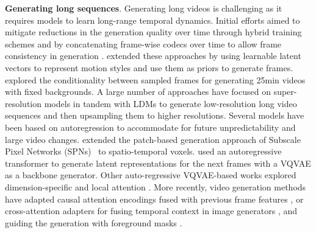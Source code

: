 


\noindent
\textbf{Generating long sequences}. Generating long videos is challenging as it requires models to learn long-range temporal dynamics. Initial efforts aimed to mitigate reductions in the generation quality over time through hybrid training schemes \citep{brooks2022generating} and by concatenating frame-wise codecs over time to allow frame consistency in generation \citep{skorokhodov2022stylegan}. \citet{shen2023mostgan} extended these approaches by using learnable latent vectors to represent motion styles and use them as priors to generate frames. \citet{harvey2022flexible} explored the conditionality between sampled frames for generating 25min videos with fixed backgrounds. A large number of approaches \citep{ho2022imagen,singer2023make} have focused on super-resolution models in tandem with LDMs to generate low-resolution long video sequences and then upsampling them to higher resolutions. Several models have been based on autoregression to accommodate for future unpredictability and large video changes. \citet{weissenborn2020scaling} extended the patch-based generation approach of Subscale Pixel Networks (SPNs)~\citep{menick2019generating} to spatio-temporal voxels. \citet{ge2022long} used an autoregressive transformer to generate latent representations for the next frames with a VQVAE as a backbone generator. Other auto-regressive VQVAE-based works explored dimension-specific \citep{wu2021godiva} and local attention \citep{liang2022nuwa,wu2022nuwa}. More recently, video generation methods have adapted causal attention encodings fused with previous frame features \citep{yan2023temporally,villegas2022phenaki}, or cross-attention adapters for fusing temporal context in image generators \citep{long2024videodrafter}, and guiding the generation with foreground masks \citep{chang2024look}.


